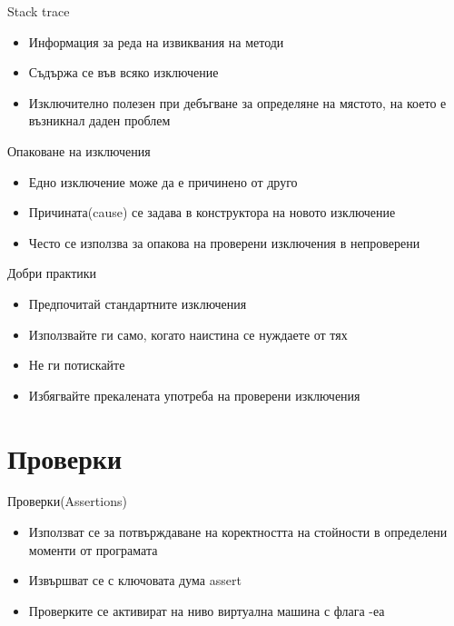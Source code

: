 \documentclass{beamer}
\begin{document}
\begin{frame}{Stack trace}
  \transdissolve
  \begin{itemize}
  \item Информация за реда на извиквания на методи  \pause
  \item Съдържа се във всяко изключение \pause
  \item Изключително полезен при дебъгване за определяне на мястото,
    на което е възникнал даден проблем
  \end{itemize}
\end{frame}

\begin{frame}{Опаковане на изключения}
  \transdissolve
  \begin{itemize}
  \item Едно изключение може да е причинено от друго \pause
  \item Причината(cause) се задава в конструктора на новото изключение \pause
  \item Често се използва за опакова на проверени изключения в непроверени
  \end{itemize}
\end{frame}

\begin{frame}{Добри практики}
  \transdissolve
  \begin{itemize}
  \item Предпочитай стандартните изключения \pause
  \item Използвайте ги само, когато наистина се нуждаете от тях \pause
  \item Не ги потискайте \pause
  \item Избягвайте прекалената употреба на проверени изключения
  \end{itemize}
\end{frame}

\section{Проверки}

\begin{frame}{Проверки(Assertions)}
  \transdissolve
  \begin{itemize}
  \item Използват се за потвърждаване на коректността на стойности в
    определени моменти от програмата \pause
  \item Извършват се с ключовата дума assert \pause
  \item Проверките се активират на ниво виртуална машина с флага -еа
  \end{itemize}
\end{frame}
\end{document}
